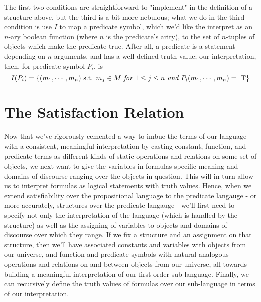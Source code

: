 \documentclass{article}
\begin{document}
\nn
The first two conditions are straightforward to "implement" in the definition of a structure above, but the third is a bit more nebulous; what we do in the third condition is use $ I $ to map a predicate symbol, which we'd like the interpret as an $ n $-ary boolean function (where $ n $ is the predicate's arity), to the set of $ n $-tuples of objects which make the predicate true. After all, a predicate is a statement depending on $ n $  arguments, and has a well-defined truth value; our interpretation, then, for predicate symbol $ P_i $, is
    $$ I(P_i) = \{ (m_1, \cdots, m_n) \textnormal{ s.t. } m_j \in M \textit{ for } 1 \leq j \leq n \textit{ and } P_i(m_1, \cdots, m_n) = \text{\normalfont\ T} \} $$

\section{The Satisfaction Relation}
Now that we've rigorously cemented a way to imbue the terms of our language with a consistent, meaningful interpretation by casting constant, function, and predicate terms as different kinds of static operations and relations on some set of objects, we next want to give the variables in formulas specific meaning and domains of discourse ranging over the objects in question. This will in turn allow us to interpret formulas as logical statements with truth values. Hence, when we extend satisfiability over the propositional language to the predicate langauge - or more accurately, structures over the predicate langauge - we'll first need to specify not only the interpretation of the language (which is handled by the structure) as well as the assigning of variables to objects and domains of discourse over which they range.
If we fix a structure and an assignment on that structure, then we'll have associated constants and variables with objects from our universe, and function and predicate symbols with natural analogous operations and relations on and between objects from our universe, all towards building a meaningful interpretation of our first order sub-language. Finally, we can recursively define the truth values of formulas over our sub-language in terms of our interpretation.
\end{document}
